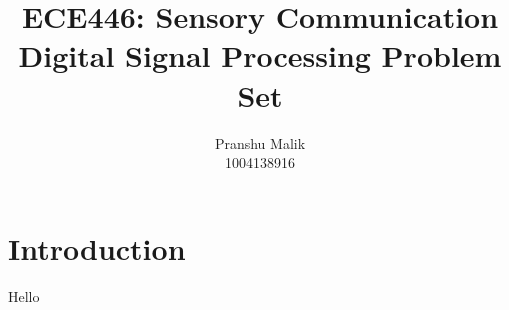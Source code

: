 \documentclass[10pt]{article}
\date{}
\begin{document}
\title{\textbf{\Large{\textsc{ECE446:} Sensory Communication}} \\ \Large{Digital Signal Processing Problem Set}\vspace{-0.3cm}}
\author{Pranshu Malik\\ \footnotesize{1004138916}\vspace{-3cm}}

\maketitle

\section{Introduction}
Hello
\end{document}

